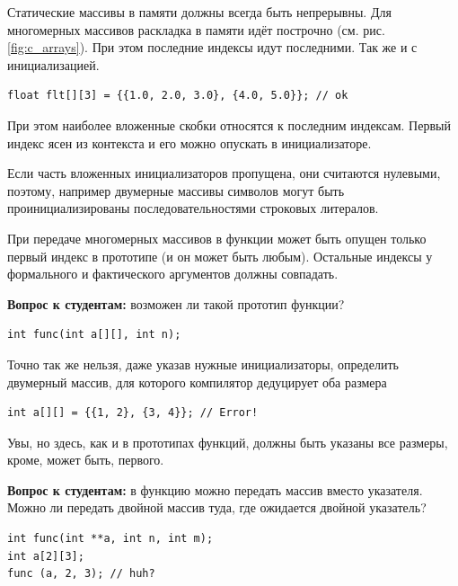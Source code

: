 \documentclass[a4paper,12pt,oneside]{book}
\newif\ifanswers
\begin{document}
Статические массивы в памяти должны всегда быть непрерывны. Для многомерных массивов раскладка в памяти идёт построчно (см. рис. \ref{fig:c_arrays}). При этом последние индексы идут последними. Так же и с инициализацией.

\begin{lstlisting}
float flt[][3] = {{1.0, 2.0, 3.0}, {4.0, 5.0}}; // ok
\end{lstlisting}

При этом наиболее вложенные скобки относятся к последним индексам. Первый индекс ясен из контекста и его можно опускать в инициализаторе.

Если часть вложенных инициализаторов пропущена, они считаются нулевыми, поэтому, например двумерные массивы символов могут быть проинициализированы последовательностями строковых литералов.

При передаче многомерных массивов в функции может быть опущен только первый индекс в прототипе (и он может быть любым). Остальные индексы у формального и фактического аргументов должны совпадать.

\textbf{Вопрос к студентам:} возможен ли такой прототип функции?

\begin{lstlisting}
int func(int a[][], int n);
\end{lstlisting}

\ifanswers
Правильный ответ: нет, так как у статического массива не могут быть опущены оба индекса. Допустимы следующие варианты:

\begin{lstlisting}
int func(int a[][3], int n);
int func(int (*a)[3], int n);
\end{lstlisting}
\fi

Точно так же нельзя, даже указав нужные инициализаторы, определить двумерный массив, для которого компилятор дедуцирует оба размера

\begin{lstlisting}
int a[][] = {{1, 2}, {3, 4}}; // Error!
\end{lstlisting}

Увы, но здесь, как и в прототипах функций, должны быть указаны все размеры, кроме, может быть, первого.

\textbf{Вопрос к студентам:} в функцию можно передать массив вместо указателя. Можно ли передать двойной массив туда, где ожидается двойной указатель?

\begin{lstlisting}
int func(int **a, int n, int m);
int a[2][3];
func (a, 2, 3); // huh?
\end{lstlisting}
\end{document}
